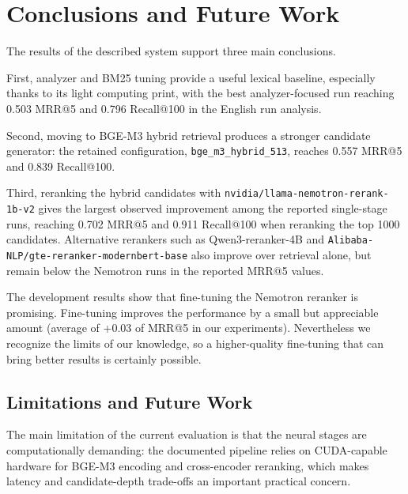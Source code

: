 \section{Conclusions and Future Work}
\label{sec:conclusion}

The results of the described system support three main conclusions. 

First, analyzer and BM25 tuning provide a useful lexical baseline, especially thanks to its light computing print, with the best analyzer-focused run reaching 0.503 MRR@5 and 0.796 Recall@100 in the English run analysis. 

Second, moving to BGE-M3 hybrid retrieval produces a stronger candidate generator: the retained configuration, \texttt{bge\_m3\_hybrid\_513}, reaches 0.557 MRR@5 and 0.839 Recall@100.

Third, reranking the hybrid candidates with \texttt{nvidia/llama-nemotron-rerank-1b-v2} gives the largest observed improvement among the reported single-stage runs, reaching 0.702 MRR@5 and 0.911 Recall@100 when reranking the top 1000 candidates. Alternative rerankers such as Qwen3-reranker-4B and \texttt{Alibaba-NLP/gte-reranker-modernbert-base} also improve over retrieval alone, but remain below the Nemotron runs in the reported MRR@5 values.

The development results show that fine-tuning the Nemotron reranker is promising. Fine-tuning improves the performance by a small but appreciable amount (average of +0.03 of MRR@5 in our experiments). Nevertheless we recognize the limits of our knowledge, so a higher-quality fine-tuning that can bring better results is certainly possible.

\subsection{Limitations and Future Work}
The main limitation of the current evaluation is that the neural stages are computationally demanding: the documented pipeline relies on CUDA-capable hardware for BGE-M3 encoding and cross-encoder reranking, which makes latency and candidate-depth trade-offs an important practical concern.

